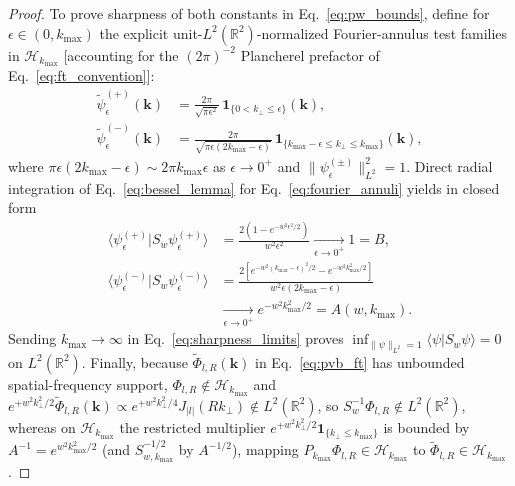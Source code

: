 \documentclass[aps,pra,onecolumn,notitlepage,11pt,tightenlines,nofootinbib,floatfix,longbibliography]{revtex4-2}
\theoremstyle{remark}
\newcommand{\braket}[2]{\langle #1 | #2 \rangle}
\newcommand{\norm}[1]{\lVert #1 \rVert}
\newcommand{\abs}[1]{\lvert #1 \rvert}
\begin{document}
\begin{proof}
To prove sharpness of both constants in Eq.~\eqref{eq:pw_bounds}, define for $\epsilon \in (0,k_{\max})$ the explicit unit-$L^2(\mathbb{R}^2)$-normalized Fourier-annulus test families in $\mathcal{H}_{k_{\max}}$ [accounting for the $(2\pi)^{-2}$ Plancherel prefactor of Eq.~\eqref{eq:ft_convention}]:
\begin{align}
\widetilde{\psi}_\epsilon^{(+)}(\mathbf{k}) &= \frac{2\pi}{\sqrt{\pi\epsilon^2}}\,\mathbf{1}_{\{0 < k_\perp \le \epsilon\}}(\mathbf{k}), \nonumber \\
\widetilde{\psi}_\epsilon^{(-)}(\mathbf{k}) &= \frac{2\pi}{\sqrt{\pi\epsilon(2k_{\max}-\epsilon)}}\,\mathbf{1}_{\{k_{\max}-\epsilon \le k_\perp \le k_{\max}\}}(\mathbf{k}),
\label{eq:fourier_annuli}
\end{align}
where $\pi\epsilon(2k_{\max}-\epsilon) \sim 2\pi k_{\max}\epsilon$ as $\epsilon \to 0^+$ and $\norm{\psi_\epsilon^{(\pm)}}_{L^2}^2 = 1$. Direct radial integration of Eq.~\eqref{eq:bessel_lemma} for Eq.~\eqref{eq:fourier_annuli} yields in closed form
\begin{align}
\braket{\psi_\epsilon^{(+)}}{S_w\psi_\epsilon^{(+)}} &= \frac{2\left(1 - e^{-w^2\epsilon^2/2}\right)}{w^2\epsilon^2} \xrightarrow[\epsilon\to 0^+]{} 1 = B, \nonumber \\
\braket{\psi_\epsilon^{(-)}}{S_w\psi_\epsilon^{(-)}} &= \frac{2\left[e^{-w^2(k_{\max}-\epsilon)^2/2} - e^{-w^2 k_{\max}^2/2}\right]}{w^2\epsilon(2k_{\max}-\epsilon)} \nonumber \\
&\xrightarrow[\epsilon\to 0^+]{} e^{-w^2 k_{\max}^2/2} = A(w,k_{\max}).
\label{eq:sharpness_limits}
\end{align}
Sending $k_{\max} \to \infty$ in Eq.~\eqref{eq:sharpness_limits} proves $\inf_{\norm{\psi}_{L^2}=1}\braket{\psi}{S_w\psi} = 0$ on $L^2(\mathbb{R}^2)$. Finally, because $\widetilde{\Phi}_{l,R}(\mathbf{k})$ in Eq.~\eqref{eq:pvb_ft} has unbounded spatial-frequency support, $\Phi_{l,R} \notin \mathcal{H}_{k_{\max}}$ and $e^{+w^2 k_\perp^2/2}\widetilde{\Phi}_{l,R}(\mathbf{k}) \propto e^{+w^2 k_\perp^2/4} J_{\abs{l}}(Rk_\perp) \notin L^2(\mathbb{R}^2)$, so $S_w^{-1}\Phi_{l,R} \notin L^2(\mathbb{R}^2)$, whereas on $\mathcal{H}_{k_{\max}}$ the restricted multiplier $e^{+w^2 k_\perp^2/2}\mathbf{1}_{\{k_\perp \le k_{\max}\}}$ is bounded by $A^{-1} = e^{w^2 k_{\max}^2/2}$ (and $S_{w,k_{\max}}^{-1/2}$ by $A^{-1/2}$), mapping $P_{k_{\max}}\Phi_{l,R} \in \mathcal{H}_{k_{\max}}$ to $\widetilde{\Phi}_{l,R} \in \mathcal{H}_{k_{\max}}$.
\end{proof}
\end{document}
